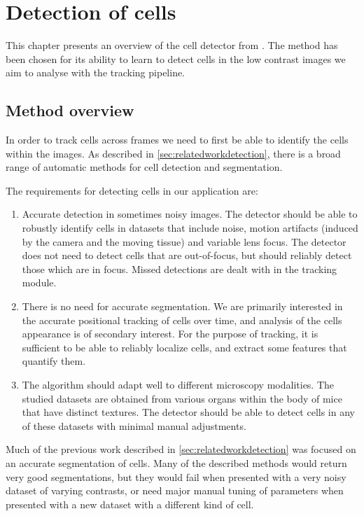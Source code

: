 \chapter{Detection of cells}
	\label{chap:cell_detection}
	
	
	This chapter presents an overview of the cell detector from \cite{arteta12}. The method has been chosen for its ability to learn to detect cells in the low contrast images we aim to analyse with the tracking pipeline.
	
	\section{Method overview}
	
	In order to track cells across frames we need to first be able to identify the cells within the images. As described in \cref{sec:relatedworkdetection}, there is a broad range of automatic methods for cell detection and segmentation.
	
	The requirements for detecting cells in our application are:
		
	\begin{enumerate}
	\item Accurate detection in sometimes noisy images. The detector should be able to robustly identify cells in datasets that include noise, motion artifacts (induced by the camera and the moving tissue) and variable lens focus. The detector does not need to detect cells that are out-of-focus, but should reliably detect those which are in focus. Missed detections are dealt with in the tracking module.
	
	\item There is no need for accurate segmentation. We are primarily interested in the accurate positional tracking of cells over time, and analysis of the cells appearance is of secondary interest. For the purpose of tracking, it is sufficient to be able to reliably localize cells, and extract some features that quantify them.
	
	\item The algorithm should adapt well to different microscopy modalities. The studied datasets are obtained from various organs within the body of mice that have distinct textures. The detector should be able to detect cells in any of these datasets with minimal  manual adjustments.
	\end{enumerate}
	
	Much of the previous work described in \cref{sec:relatedworkdetection} was focused on an accurate segmentation of cells. Many of the described methods would return very good segmentations, but they would fail when presented with a very noisy dataset of varying contrasts, or need major manual tuning of parameters when presented with a new dataset with a different kind of cell.
	
